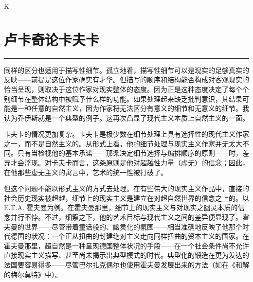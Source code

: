 \documentclass[12pt,a4paper]{article}
\begin{document}
K

\newpage
\section{卢卡奇论卡夫卡}
\vspace{0.5em}
\vspace{0.3em}

\noindent\rule{\textwidth}{0.4pt}

\vspace{0.3em}



同样的区分也适用于描写性细节。孤立地看，描写性细节可以是现实的足够真实的反映——前提是这位作家确实有才华。但描写的顺序和结构能否构成对客观现实的恰当呈现，则取决于这位作家对现实整体的态度。因为正是这种态度决定了每个个别细节在整体结构中被赋予什么样的功能。如果处理起来缺乏批判意识，其结果可能是一种任意的自然主义，因为作家将无法区分有意义的细节和无意义的细节。我认为乔伊斯就是一个典型的例子。这再次凸显了现代主义本质上自然主义的一面。



卡夫卡的情况更加复杂。卡夫卡是极少数在细节处理上具有选择性的现代主义作家之一，而不是自然主义的。从形式上看，他的细节处理与现实主义作家并无太大不同。只有当检视他的基本承诺——那条决定细节选择与编排顺序的原则——时，差异才会浮现。对卡夫卡而言，这条原则是他对超越性力量（虚无）的信念；因此，在他那些虚无主义的寓言中，艺术的统一性被打破了。



但这个问题不能以形式主义的方式去处理。在有些伟大的现实主义作品中，直接的社会历史现实被超越，细节上的现实主义是建立在对超自然世界的信念之上的。以 E.T.A. 霍夫曼为例。在霍夫曼那里，细节上的现实主义与对现实之幽灵本质的信念并行不悖。不过，细察之下，他的艺术目标与现代主义之间的差异便显现了。霍夫曼的世界——尽管带着童话般的、幽灵化的氛围——相当准确地反映了他那个时代德国的状况：一个正从扭曲的封建绝对主义走向同样扭曲的资本主义的国家。在霍夫曼那里，超自然是一种呈现德国整体状况的手段——在一个社会条件尚不允许直接现实主义描写、甚至尚未揭示出典型模式的时代。典型化的锻造在更为发达的法国要容易得多——尽管巴尔扎克偶尔也使用霍夫曼发展出来的方法（如在《和解的梅尔莫特》中）。
\end{document}
